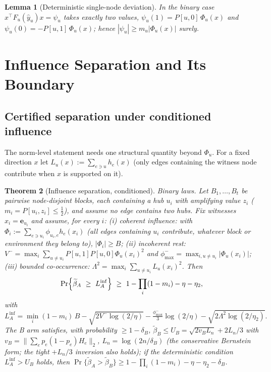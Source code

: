 \documentclass[preprint,11pt]{elsarticle}
\newtheorem{theorem}{Theorem}[section]
\newtheorem{lemma}[theorem]{Lemma}
\begin{document}
\begin{lemma}[Deterministic single-node deviation]\label{lem:dev}
In the binary case $x^\top F_u(\hat y_u)x=\psi_u$ takes exactly two
values, $\psi_u(1)=P[u,0]\,\Phi_u(x)$ and
$\psi_u(0)=-P[u,1]\,\Phi_u(x)$; hence
$|\psi_u|\ge m_u|\Phi_u(x)|$ surely.
\end{lemma}

\section{Influence Separation and Its Boundary}\label{sec:theory}

\subsection{Certified separation under conditioned influence}

The norm-level statement needs one structural quantity beyond
$\Phi_u$. For a fixed direction $x$ let
$L_u(x):=\sum_{e\ni u}h_e(x)$ (only edges containing the witness node
contribute when $x$ is supported on it).

\begin{theorem}[Influence separation, conditioned]\label{thm:sep}
Binary laws. Let $B_1,\dots,B_t$ be pairwise node-disjoint blocks, each
containing a hub $u_i$ with amplifying value $z_i$
($m_i=P[u_i,z_i]\le\tfrac12$), and assume \emph{no edge contains two
hubs}. Fix witnesses $x_i=\mathbf e_{u_i}$ and
assume, for every $i$:
(i) \emph{coherent influence}: with
$\Phi_i:=\sum_{e\ni u_i}\phi_{u_i,e}h_e(x_i)$ (all edges containing
$u_i$ contribute, whatever block or environment they belong to),
$|\Phi_i|\ge B$;
(ii) \emph{incoherent rest}:
$V^-=\max_i\sum_{u\ne u_i}P[u,1]P[u,0]\Phi_u(x_i)^2$ and
$\phi^-_{\max}=\max_{i,u\ne u_i}|\Phi_u(x_i)|$;
(iii) \emph{bounded co-occurrence}:
$\Lambda^2=\max_i\sum_{u\ne u_i}L_u(x_i)^2$. Then
\[
\Pr\Bigl\{\widetilde\beta_A\ \ge\ L_A^{\mathrm{inf}}\Bigr\}
\ \ge\ 1-\prod_i(1-m_i)-\eta-\eta_2 ,
\]
with
\[
L_A^{\mathrm{inf}}=\min_i(1-m_i)\,B
-\sqrt{2V^-\log(2/\eta)}-\tfrac{\phi^-_{\max}}3\log(2/\eta)
-\sqrt{2\Lambda^2\log(2/\eta_2)} .
\]
The B arm satisfies, with probability $\ge1-\delta_B$,
$\widetilde\beta_B\le U_B=\sqrt{2v_BL_n}+2L_n/3$ with
$v_B=\bigl\|\sum_ep_e(1-p_e)H_e\bigr\|_2$, $L_n=\log(2n/\delta_B)$
(the conservative Bernstein form; the tight ${+}L_n/3$ inversion also
holds);
if the deterministic condition
$L_A^{\mathrm{inf}}>U_B$
holds, then
$\Pr\{\widetilde\beta_A>\widetilde\beta_B\}\ge
1-\prod_i(1-m_i)-\eta-\eta_2-\delta_B$.
\end{theorem}
\end{document}

